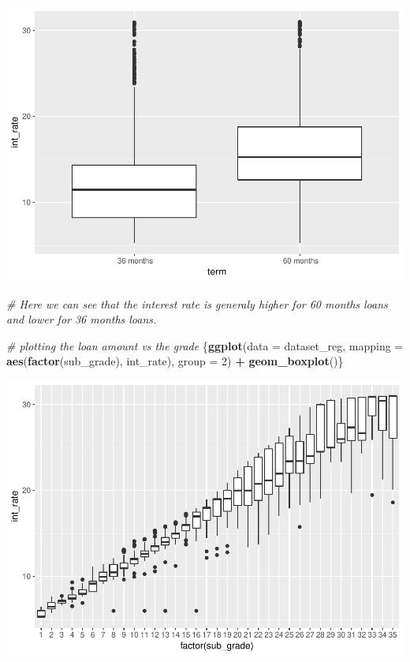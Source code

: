 \documentclass[]{article}
\newenvironment{Shaded}{\begin{snugshade}}{\end{snugshade}}
\newcommand{\CommentTok}[1]{\textcolor[rgb]{0.56,0.35,0.01}{\textit{#1}}}
\newcommand{\DataTypeTok}[1]{\textcolor[rgb]{0.13,0.29,0.53}{#1}}
\newcommand{\DecValTok}[1]{\textcolor[rgb]{0.00,0.00,0.81}{#1}}
\newcommand{\KeywordTok}[1]{\textcolor[rgb]{0.13,0.29,0.53}{\textbf{#1}}}
\newcommand{\NormalTok}[1]{#1}
\newcommand{\OperatorTok}[1]{\textcolor[rgb]{0.81,0.36,0.00}{\textbf{#1}}}
\newcommand{\StringTok}[1]{\textcolor[rgb]{0.31,0.60,0.02}{#1}}
\begin{document}
\includegraphics{Machine_learning_Group_7_files/figure-latex/Data Exploration - interest rate vs term-1.pdf}

\begin{Shaded}
\begin{Highlighting}[]
\CommentTok{# Here we can see that the interest rate is generaly higher for 60 months loans and lower for 36 months loans.}
\end{Highlighting}
\end{Shaded}

\begin{Shaded}
\begin{Highlighting}[]
\CommentTok{# plotting the loan amount vs the grade}
\NormalTok{\{}\KeywordTok{ggplot}\NormalTok{(}\DataTypeTok{data =}\NormalTok{ dataset_reg, }\DataTypeTok{mapping =} \KeywordTok{aes}\NormalTok{(}\KeywordTok{factor}\NormalTok{(sub_grade), int_rate), }\DataTypeTok{group =} \DecValTok{2}\NormalTok{) }\OperatorTok{+}
\StringTok{  }\KeywordTok{geom_boxplot}\NormalTok{()\}}
\end{Highlighting}
\end{Shaded}

\includegraphics{Machine_learning_Group_7_files/figure-latex/Data Exploration - interest rate vs grade-1.pdf}
\end{document}
